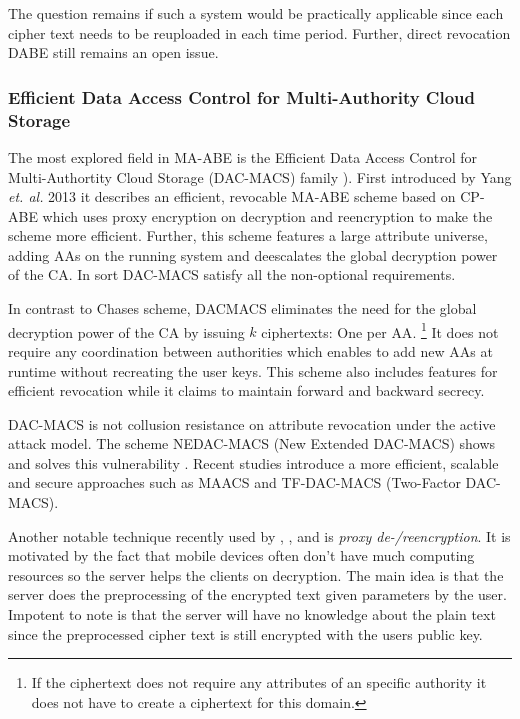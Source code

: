 The question remains if such a system would be practically applicable since each cipher text needs to be reuploaded in each time period. Further, direct revocation DABE still remains an open issue.

\subsubsection{Efficient Data Access Control for Multi-Authority Cloud Storage}
The most explored field in \ac{MA-ABE} is the Efficient Data Access Control for Multi-Authortity Cloud Storage (\ac{DAC-MACS}) family \cite{yang2013dac}). First introduced by Yang \textit{et. al.} 2013 it describes an efficient, revocable \ac{MA-ABE} scheme based on \ac{CP-ABE} which uses proxy encryption on decryption and reencryption to make the scheme more efficient. Further, this scheme features a large attribute universe, adding \ac{AA}s on the running system and deescalates the global decryption power of the \ac{CA}. In sort \ac{DAC-MACS} satisfy all the non-optional requirements.

In contrast to Chases scheme, DACMACS eliminates the need for the global decryption power of the \ac{CA} by issuing $k$ ciphertexts: One per \ac{AA}. \footnote{If the ciphertext does not require any attributes of an specific authority it does not have to create a ciphertext for this domain.} It does not require any coordination between authorities which enables to add new \ac{AA}s at runtime without recreating the user keys. This scheme also includes features for efficient revocation while it claims to maintain forward and backward secrecy.

\ac{DAC-MACS} is not collusion resistance on attribute revocation under the active attack model. The scheme \ac{NEDAC-MACS} (New Extended \ac{DAC-MACS}) shows and solves this vulnerability \cite{wu2017security}. Recent studies introduce a more efficient, scalable and secure approaches such as \ac{MAACS} \cite{li2016secure} and \ac{TF-DAC-MACS} (Two-Factor \ac{DAC-MACS})\cite{li2017two}. 

Another notable technique recently used by \cite{yang2013dac}, \cite{wu2017security}, \cite{li2017two} and \cite{wang2011hierarchical} is \textit{proxy de-/reencryption}. It is motivated by the fact that mobile devices often don't have much computing resources so the server helps the clients on decryption. The main idea is that the server does the preprocessing of the encrypted text given parameters by the user. Impotent to note is that the server will have no knowledge about the plain text since the preprocessed cipher text is still encrypted with the users public key. 

